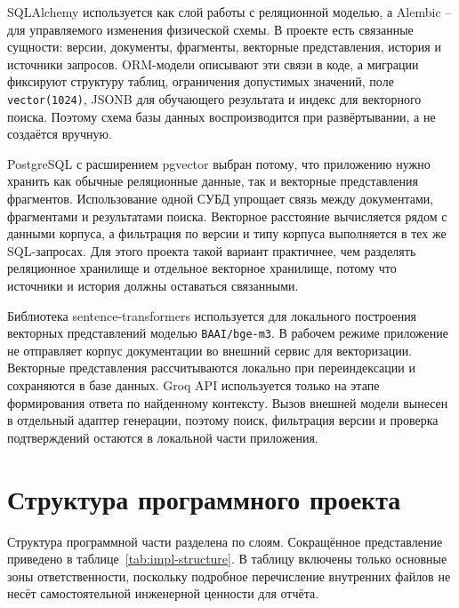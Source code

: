SQLAlchemy используется как слой работы с реляционной моделью, а Alembic -- для управляемого изменения физической схемы. В проекте есть связанные сущности: версии, документы, фрагменты, векторные представления, история и источники запросов. ORM-модели описывают эти связи в коде, а миграции фиксируют структуру таблиц, ограничения допустимых значений, поле \texttt{vector(1024)}, JSONB для обучающего результата и индекс для векторного поиска. Поэтому схема базы данных воспроизводится при развёртывании, а не создаётся вручную.

PostgreSQL с расширением pgvector выбран потому, что приложению нужно хранить как обычные реляционные данные, так и векторные представления фрагментов. Использование одной СУБД упрощает связь между документами, фрагментами и результатами поиска. Векторное расстояние вычисляется рядом с данными корпуса, а фильтрация по версии и типу корпуса выполняется в тех же SQL-запросах. Для этого проекта такой вариант практичнее, чем разделять реляционное хранилище и отдельное векторное хранилище, потому что источники и история должны оставаться связанными.

Библиотека sentence-transformers используется для локального построения векторных представлений моделью \texttt{BAAI/bge-m3}. В рабочем режиме приложение не отправляет корпус документации во внешний сервис для векторизации. Векторные представления рассчитываются локально при переиндексации и сохраняются в базе данных. Groq API используется только на этапе формирования ответа по найденному контексту. Вызов внешней модели вынесен в отдельный адаптер генерации, поэтому поиск, фильтрация версии и проверка подтверждений остаются в локальной части приложения.

\section{Структура программного проекта}

Структура программной части разделена по слоям. Сокращённое представление приведено в таблице~\ref{tab:impl-structure}. В таблицу включены только основные зоны ответственности, поскольку подробное перечисление внутренних файлов не несёт самостоятельной инженерной ценности для отчёта.

